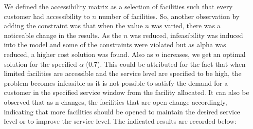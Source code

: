 \documentclass[12pt]{article}
\numberwithin{equation}{section}
\begin{document}
We defined the accessibility matrix as a selection of facilities such that every customer had accessibility to $n$ number of facilities. So, another observation by adding the constraint was that when the value $n$ was varied, there was a noticeable change in the results. As the $n$ was reduced, infeasibility was induced into the model and some of the constraints were violated but as alpha was reduced, a higher cost solution was found. Also as $n$ increases, we get an optimal solution for the specified $\alpha$ (0.7). This could be attributed for the fact that when limited facilities are accessible and the service level are specified to be high, the problem becomes infeasible as it is not possible to satisfy the demand for a customer in the specified service window from the facility allocated. It can also be observed that as n changes, the facilities that are open change accordingly, indicating that more facilities should be opened to maintain the desired service level or to improve the service level. The indicated results are recorded below:
\end{document}

